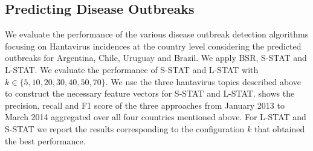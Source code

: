 \documentclass[conference]{IEEEtran}
\newcommand{\fullmodel}{{S-STAT}\xspace}
\newcommand{\locationmodel}{{L-STAT}\xspace}
\begin{document}
\subsection{Predicting Disease Outbreaks}
We evaluate the performance of the various disease outbreak detection algorithms focusing on Hantavirus incidences at the country level considering the predicted outbreaks for Argentina, Chile, Uruguay and Brazil.  We apply BSR,  \fullmodel and \locationmodel. We evaluate the performance of \fullmodel and \locationmodel with $k \in \{5,10,20,30,40,50,70\}$. We use the three hantavirus topics described above to construct the necessary feature vectors for \fullmodel and \locationmodel.   shows the precision, recall and F1 score  of the three approaches from January 2013 to March 2014 aggregated over all four countries mentioned above. For \locationmodel and \fullmodel we report the results corresponding to the configuration $k$ that obtained the best performance. 
\end{document}
